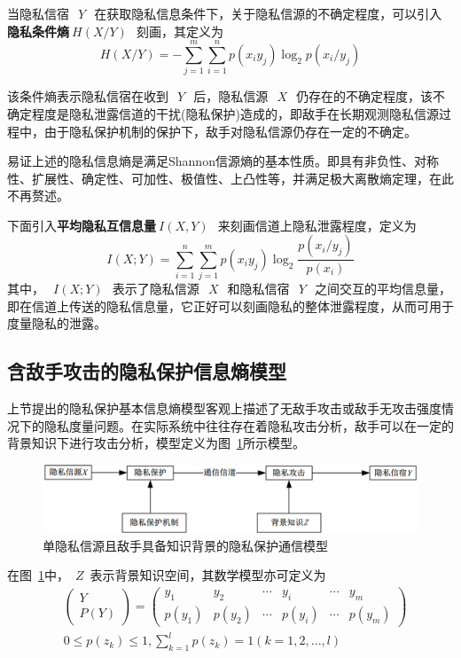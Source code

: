 当隐私信宿~$~Y~$~在获取隐私信息条件下，关于隐私信源的不确定程度，可以引入\textbf{隐私条件熵}$~H(X/Y)~$~刻画，其定义为
\begin{equation}
H(X/Y)=-\sum_{j=1}^{m}\sum_{i=1}^{n}p(x_{i}y_{j})\log_{2}p(x_{i}/y_{j})
\end{equation}

该条件熵表示隐私信宿在收到~$~Y~$~后，隐私信源~$~X~$~仍存在的不确定程度，该不确定程度是隐私泄露信道的干扰(隐私保护)造成的，即敌手在长期观测隐私信源过程中，由于隐私保护机制的保护下，敌手对隐私信源仍存在一定的不确定。

易证上述的隐私信息熵是满足Shannon信源熵的基本性质。即具有非负性、对称性、扩展性、确定性、可加性、极值性、上凸性等，并满足极大离散熵定理，在此不再赘述。

下面引入\textbf{平均隐私互信息量}$~I(X,Y)~$~来刻画信道上隐私泄露程度，定义为
\begin{equation}
I(X;Y)=\sum_{i=1}^{n}\sum_{j=1}^{m}p(x_{i}y_{j})\log_{2}\frac{p(x_{i}/y_{j})}{p(x_{i})}
\end{equation}
其中，~$~I(X;Y)~$~表示了隐私信源~$~X~$~和隐私信宿~$~Y~$~之间交互的平均信息量，即在信道上传送的隐私信息量，它正好可以刻画隐私的整体泄露程度，从而可用于度量隐私的泄露。

\subsection{含敌手攻击的隐私保护信息熵模型}\label{subsec:privacy-preserving-attack}

上节提出的隐私保护基本信息熵模型客观上描述了无敌手攻击或敌手无攻击强度情况下的隐私度量问题。在实际系统中往往存在着隐私攻击分析，敌手可以在一定的背景知识下进行攻击分析，模型定义为图~\ref{fig:Communication-Model-for-Privacy-of-Single}所示模型。
\begin{figure}[htbp]
	\centering
	\includegraphics[width = 0.95\linewidth]{./figures/Communication-Model-for-Privacy-of-Single.png}
	\caption{单隐私信源且敌手具备知识背景的隐私保护通信模型}
	\label{fig:Communication-Model-for-Privacy-of-Single}
\end{figure}

在图~\ref{fig:Communication-Model-for-Privacy-of-Single}中，~$Z$~表示背景知识空间，其数学模型亦可定义为
\begin{equation}
\begin{split}
&\begin{pmatrix}
Y\\ 
P(Y)
\end{pmatrix}=\begin{pmatrix}
y_{1} & y_{2} & \cdots  & y_{i} & \cdots  & y_{m}\\ 
p(y_{1})& p(y_{2}) & \cdots & p(y_{i}) & \cdots & p(y_{m})
\end{pmatrix} \\
&0 \leqslant p(z_{k})\leqslant 1,\sum_{k=1}^{l}p(z_{k})=1(k=1,2,...,l)
\end{split}
\end{equation}

